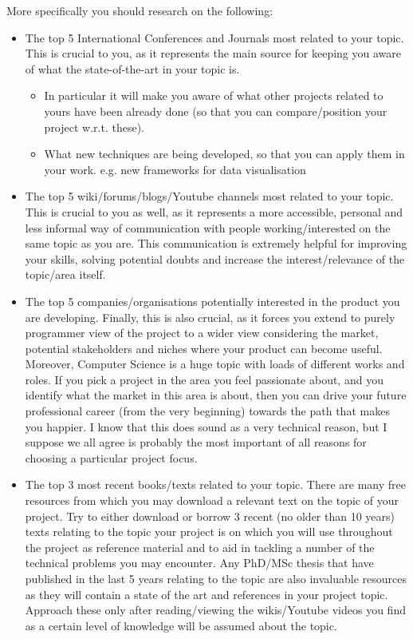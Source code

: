 More specifically you should research on the following:
\begin{itemize}
    \item The top 5 International Conferences and Journals most related to your topic. This is crucial to you, as it represents the main source for keeping you aware of what the state-of-the-art in your topic is.
    \begin{itemize}
        \item In particular it will make you aware of what other projects related to yours have been already done (so that you can compare/position your project w.r.t. these).
        \item What new techniques are being developed, so that you can apply them in your work. e.g. new frameworks for data visualisation
    \end{itemize}
    
    \item The top 5 wiki/forums/blogs/Youtube channels most related to your topic. This is crucial to you as well, as it represents a more accessible, personal and less informal way of communication with people working/interested on the same topic as you are. This communication is extremely helpful for improving your skills, solving potential doubts and increase the interest/relevance of the topic/area itself.
    \item The top 5 companies/organisations potentially interested in the product you are developing. Finally, this is also crucial, as it forces you extend to purely programmer view of the project to a wider view considering the market, potential stakeholders and niches where your product can become useful. Moreover, Computer Science is a huge topic with loads of different works and roles. If you pick a project in the area you feel passionate about, and you identify what the market in this area is about, then you can drive your future professional career (from the very beginning) towards the path that makes you happier. I know that this does sound as a very technical reason, but I suppose we all agree is probably the most important of all reasons for choosing a particular project focus. 
    \item The top 3 most recent books/texts related to your topic. There are many free resources from which you may download a relevant text on the topic of your project. Try to either download or borrow 3 recent (no older than 10 years) texts relating to the topic your project is on which you will use throughout the project as reference material and to aid in tackling a number of the technical problems you may encounter. Any PhD/MSc thesis that have published in the last 5 years relating to the topic are also invaluable resources as they will contain a state of the art and references in your project topic. Approach these only after reading/viewing the wikis/Youtube videos you find as a certain level of knowledge will be assumed about the topic.
\end{itemize}

